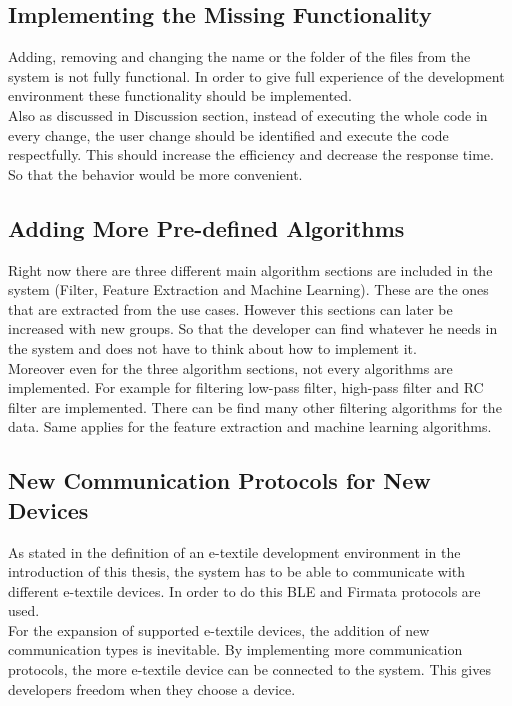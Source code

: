 \subsection{Implementing the Missing Functionality}

Adding, removing and changing the name or the folder of the files from the system is not fully functional. In order to give full experience of the development environment these functionality should be implemented. \\

Also as discussed in Discussion section, instead of executing the whole code in every change, the user change should be identified and execute the code respectfully. This should increase the efficiency and decrease the response time. So that the behavior would be more convenient.
	
\subsection{Adding More Pre-defined Algorithms}

Right now there are three different main algorithm sections are included in the system (Filter, Feature Extraction and Machine Learning). These are the ones that are extracted from the use cases. However this sections can later be increased with new groups. So that the developer can find whatever he needs in the system and does not have to think about how to implement it. \\

Moreover even for the three algorithm sections, not every algorithms are implemented. For example for filtering low-pass filter, high-pass filter and RC filter are implemented. There can be find many other filtering algorithms for the data. Same applies for the feature extraction and machine learning algorithms.


\subsection{New Communication Protocols for New Devices}
As stated in the definition of an e-textile development environment in the introduction of this thesis, the system has to be able to communicate with different e-textile devices. In order to do this BLE and Firmata protocols are used.	\\ 

For the expansion of supported e-textile devices, the addition of new communication types is inevitable. By implementing more communication protocols, the more e-textile device can be connected to the system. This gives developers freedom when they choose a device. \\

